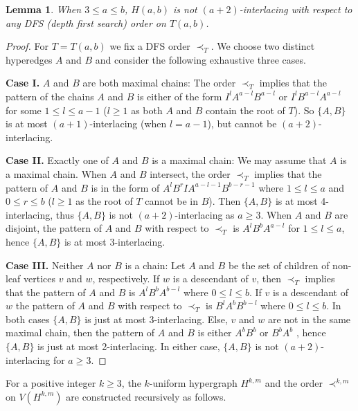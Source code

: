 \documentclass{article}
\newtheorem{lemma}[thm]{Lemma}
\theoremstyle{definition}
\begin{document}
\begin{lemma} \label{lemma_base_step_H(a,b)}
  When $3\leq a \leq b$, $H(a,b)$ is not $(a+2)$-interlacing with respect to any DFS (depth first search) order on $T(a,b)$.
\end{lemma}
\begin{proof}
For $T=T(a,b)$ we fix a DFS order $\prec_T$. We choose two distinct hyperedges $A$ and $B$ and consider the following exhaustive three cases. 

\smallskip

\textbf{Case I.} $A$ and $B$ are both maximal chains: The order $\prec_T$ implies that the pattern of the chains $A$ and $B$ is either of the form $I^lA^{a-l}B^{a-l}$ or $I^lB^{a-l}A^{a-l}$ for some $1\leq l \leq a-1$ ($l\ge 1$ as both $A$ and $B$ contain the root of $T$). So $\{A, B\}$ is at most $(a+1)$-interlacing (when $l=a-1$), but cannot be $(a+2)$-interlacing.

\smallskip 

\textbf{Case II.} Exactly one of $A$ and $B$ is a maximal chain: We may assume that $A$ is a maximal chain. When $A$ and $B$ intersect, the order $\prec_T$ implies that the pattern of $A$ and $B$ is in the form of $A^lB^rIA^{a-l-1}B^{b-r-1}$ where $1\leq l \leq a$ and $0 \leq r \leq b$ ($l\geq 1$ as the root of $T$ cannot be in $B$). Then $\{A,B\}$ is at most 4-interlacing, thus $\{A,B\}$ is not $(a+2)$-interlacing as $a \geq 3$. When $A$ and $B$ are disjoint, the pattern of $A$ and $B$ with respect to $\prec_T$ is $A^lB^bA^{a-l}$ for $1\leq l \leq a$,
hence $\{A,B\}$ is at most 3-interlacing.

\smallskip
		
\textbf{Case III.} Neither $A$ nor $B$ is a chain: Let $A$ and $B$ be the set of children of non-leaf vertices $v$ and $w$, respectively. 
If $w$ is a descendant of $v$, then $\prec_T$ implies that the pattern of $A$ and $B$ is $A^lB^bA^{b-l}$  where $0\leq l \leq b$. 
If $v$ is a descendant of $w$ the pattern of $A$ and $B$ with respect to $\prec_T$ is $B^lA^bB^{b-l}$ where $0\leq l \leq b$. In both cases $\{A,B\}$ is just at most 3-interlacing. Else, $v$ and $w$ are not in the same maximal chain, then the pattern of $A$ and $B$ is either $A^bB^b$ or $B^bA^b$ , hence $\{A,B\}$ is just at most 2-interlacing. In either case, $\{A,B\}$ is not $(a+2)$-interlacing for $a\geq 3$.
\end{proof}

For a positive integer $k \geq 3$, the $k$-uniform hypergraph $H^{k,m}$ and the order $\prec^{k, m}$ on $V(H^{k,m})$ are constructed recursively as follows.
\end{document}
